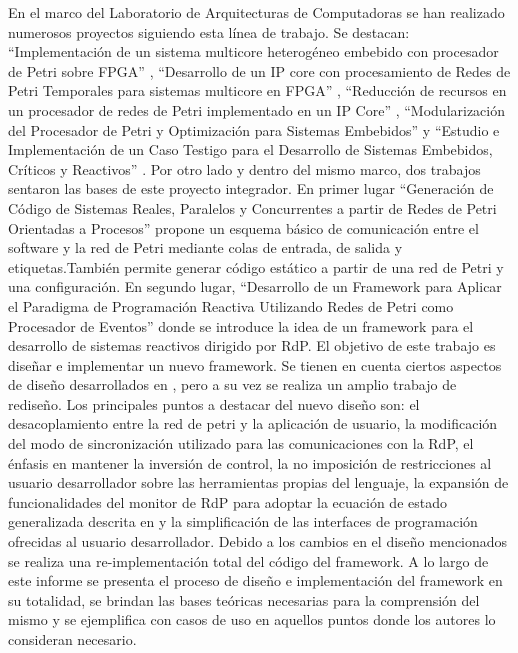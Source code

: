 En el marco del Laboratorio de Arquitecturas de Computadoras se han realizado
numerosos proyectos siguiendo esta línea de trabajo. Se destacan:
“Implementación de un sistema multicore heterogéneo embebido con procesador de
Petri sobre FPGA” \cite{Gallia-Pereyra}, “Desarrollo de un IP core con
procesamiento de Redes de Petri Temporales para sistemas multicore en FPGA”
\cite{Nonino-Pisetta-Micolini}, “Reducción de recursos en un procesador de redes
de Petri implementado en un IP Core” \cite{Birocco-Arlettaz-Micolini},
“Modularización del Procesador de Petri y Optimización para Sistemas Embebidos”
\cite{Daniele} y “Estudio e Implementación de un Caso Testigo para el
Desarrollo de Sistemas Embebidos, Críticos y Reactivos” \cite{Bentivegna-Ludemann}.
Por otro lado y dentro del mismo marco, dos trabajos sentaron las bases de este
proyecto integrador. En primer lugar “Generación de Código de Sistemas Reales,
Paralelos y Concurrentes a partir de Redes de Petri Orientadas a Procesos”
\cite{codegen} propone un esquema básico de comunicación entre el software y la
red de Petri mediante colas de entrada, de salida y etiquetas.También permite
generar código estático a partir de una red de Petri y una configuración. En
segundo lugar, “Desarrollo de un Framework para Aplicar el Paradigma de
Programación Reactiva Utilizando Redes de Petri como Procesador de
Eventos”\cite{chimp} donde se introduce la idea de un framework para el
desarrollo de sistemas reactivos dirigido por RdP.
El objetivo de este trabajo es diseñar e implementar un nuevo framework. Se
tienen en cuenta ciertos aspectos de diseño desarrollados en \cite{chimp},
pero a su vez se realiza un amplio trabajo de rediseño. Los principales puntos
a destacar del nuevo diseño son: el desacoplamiento entre la red de petri y la
aplicación de usuario, la modificación del modo de sincronización utilizado
para las comunicaciones con la RdP, el énfasis en mantener la inversión de
control, la no imposición de restricciones al usuario desarrollador sobre las
herramientas propias del lenguaje, la expansión de funcionalidades del monitor
de RdP para adoptar la ecuación de estado generalizada descrita en
\cite{Ecuacion_generalizada_LAC} y la simplificación de las interfaces de
programación ofrecidas al usuario desarrollador. Debido a los cambios en el
diseño mencionados se realiza una re-implementación total del código del
framework. A lo largo de este informe se presenta el proceso de diseño e
implementación del framework en su totalidad, se brindan las bases teóricas
necesarias para la comprensión del mismo y se ejemplifica con casos de uso en
aquellos puntos donde los autores lo consideran necesario.
